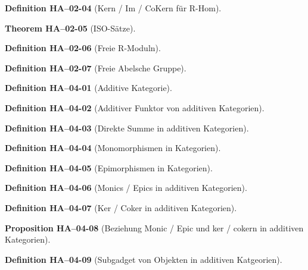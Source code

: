 \documentclass[10pt, letterpaper]{article}
\newcommand{\CustomHeading}[3]{%
  \par\medskip\noindent%
  \textbf{#1 #2} \textnormal{(#3)}.\enskip%
}
\newenvironment{DEF}[2]{\CustomHeading{Definition}{#1}{#2}}{}
\newenvironment{PROP}[2]{\CustomHeading{Proposition}{#1}{#2}}{}
\newenvironment{THEO}[2]{\CustomHeading{Theorem}{#1}{#2}}{}
\begin{document}
\begin{DEF}{HA--02-04}{Kern / Im / CoKern für R-Hom}
\end{DEF}

\begin{THEO}{HA--02-05}{ISO-Sätze}
\end{THEO}

\begin{DEF}{HA--02-06}{Freie R-Moduln}
\end{DEF}

\begin{DEF}{HA--02-07}{Freie Abelsche Gruppe}
\end{DEF}

\begin{DEF}{HA--04-01}{Additive Kategorie}
\end{DEF}

\begin{DEF}{HA--04-02}{Additiver Funktor von additiven Kategorien}
\end{DEF}

\begin{DEF}{HA--04-03}{Direkte Summe in additiven Kategorien}
\end{DEF}

\begin{DEF}{HA--04-04}{Monomorphismen in Kategorien}
\end{DEF}

\begin{DEF}{HA--04-05}{Epimorphismen in Kategorien}
\end{DEF}

\begin{DEF}{HA--04-06}{Monics / Epics in additiven Kategorien}
\end{DEF}

\begin{DEF}{HA--04-07}{Ker / Coker in additiven Kategorien}
\end{DEF}

\begin{PROP}{HA--04-08}{Beziehung Monic / Epic und ker / cokern in additiven Kategorien}
\end{PROP}

\begin{DEF}{HA--04-09}{Subgadget von Objekten in additiven Katgeorien}
\end{DEF}
\end{document}
